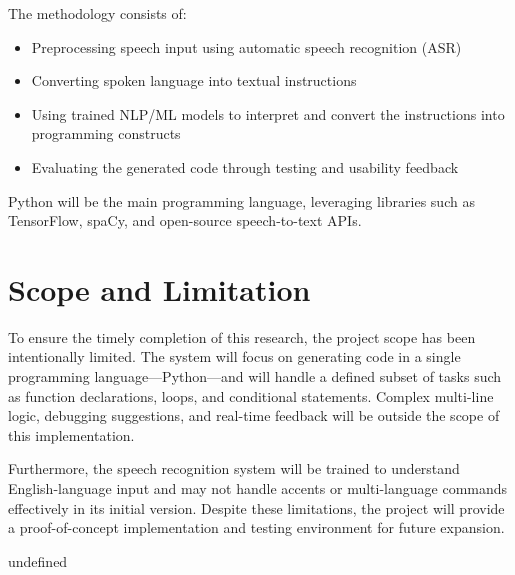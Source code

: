 The methodology consists of:
\begin{itemize}
    \item Preprocessing speech input using automatic speech recognition (ASR)
    \item Converting spoken language into textual instructions
    \item Using trained NLP/ML models to interpret and convert the instructions into programming constructs
    \item Evaluating the generated code through testing and usability feedback
\end{itemize}

Python will be the main programming language, leveraging libraries such as TensorFlow, spaCy, and open-source speech-to-text APIs.

\section{Scope and Limitation}

To ensure the timely completion of this research, the project scope has been intentionally limited. The system will focus on generating code in a single programming language—Python—and will handle a defined subset of tasks such as function declarations, loops, and conditional statements. Complex multi-line logic, debugging suggestions, and real-time feedback will be outside the scope of this implementation.

Furthermore, the speech recognition system will be trained to understand English-language input and may not handle accents or multi-language commands effectively in its initial version. Despite these limitations, the project will provide a proof-of-concept implementation and testing environment for future expansion.

undefined